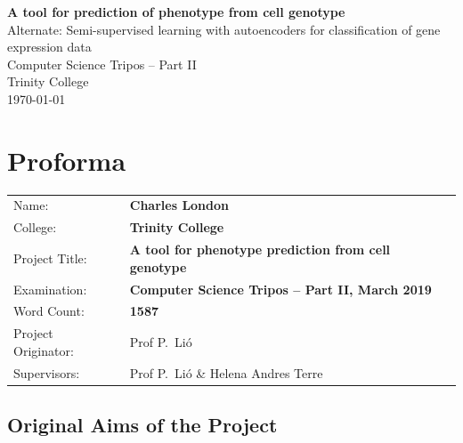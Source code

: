 \documentclass[12pt,a4paper,twoside,openright]{report}
\begin{document}

\pagestyle{empty}


\vspace*{60mm}
\begin{center}
\Huge
\textbf{A tool for prediction of phenotype from cell genotype} \\[5mm]
{\Large Alternate: Semi-supervised learning with autoencoders for classification of gene expression data} \\[5mm]
Computer Science Tripos -- Part II \\[5mm]
Trinity College \\[5mm]
\today  %
\end{center}


\pagestyle{plain}

\chapter*{Proforma}

{\large
\begin{tabular}{ll}
Name:               & \bf Charles London                      \\
College:            & \bf Trinity College                     \\
Project Title:      & \bf A tool for phenotype prediction from cell genotype  \\
Examination:        & \bf Computer Science Tripos -- Part II, March 2019  \\
Word Count:         & \bf 1587\footnotemark[1]  \\
Project Originator: & Prof P.~Li\'o                   \\
Supervisors:         & Prof P.~Li\'o \& Helena Andres Terre                   \\ 
\end{tabular}
}

\section*{Original Aims of the Project}
\end{document}
